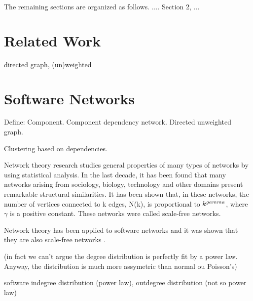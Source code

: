 The remaining sections are organized as follows. .... Section 2, ...


\section{Related Work}



directed graph, (un)weighted

\section{Software Networks}

Define: Component. Component dependency network. Directed unweighted graph.

Clustering based on dependencies.

Network theory research studies general properties of many types of networks by
using statistical analysis. In the last decade, it has been found that many
networks arising from sociology, biology, technology and other domains present
remarkable structural similarities. It has been shown that, in these networks,
the number of vertices connected to k edges, N(k), is proportional to
$k^{\-gamma}$, where $\gamma$ is a positive constant. These networks were called
scale-free networks.

Network theory has been applied to software networks and it was shown that they
are also scale-free networks \cite{Myers2003,Valverde2003}.

(in fact we can't argue the degree distribution is perfectly fit by a power law.
Anyway, the distribution is much more assymetric than normal ou Poisson's)

software indegree distribution (power law), outdegree distribution (not so power
law)

